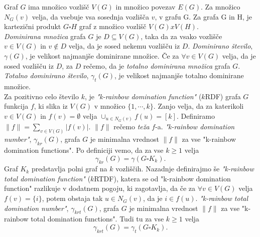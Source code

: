 \documentclass[a4paper]{article}
\begin{document}
Graf $G$ ima množico vozlišč $V(G)$ in množico povezav $E(G)$. Za množico $N_G(v)$ velja, da vsebuje vsa sosednja vozlišča $v$, v grafu G. Za grafa G in H, je kartezični produkt $G \square H$ graf z množico vozlišč $V(G) x V(H)$.\\
\textit{Dominirana množica} grafa $G$ je $D \subseteq V(G)$, taka da za vsako vozlišče $v \in V(G)$ in $v \notin D$ velja, da je sosed nekemu vozlišču iz $D$. \textit{Dominirano število}, $\gamma(G)$, je velikost najmanjše dominirane množice. Če za $\forall v \in V(G)$ velja, da je sosed vozlišču iz $D$, za $D$ rečemo, da je \textit{totalno dominirana množica} grafa $G$. \textit{Totalno dominirano število}, $\gamma_{t}(G)$, je velikost najmanjše totalno dominirane množice.\\
Za pozitivno celo število $k$, je \textit{"k-rainbow domination function"} ($k$RDF) grafa $G$ funkcija $f$, ki slika iz $V(G)$ v množico $\{1, \cdots, k\}$. Zanjo velja, da za katerikoli $v \in V(G)$ in $f(v) = \emptyset$ velja $\cup_{u \in N_G(v)} f(u) = [k]$. Definiramo $\|f\| = \sum_{v \in V(G)}|f(v)|$. $\|f\|$ rečemo \textit{teža} $f$-a. \textit{"k-rainbow domination number"}, $\gamma_{kr}(G)$, grafa $G$ je minimalna vrednost $\|f\|$ za vse "k-rainbow domination functions". Po definiciji vemo, da za vse $k \geq 1$ velja $$\gamma_{kr}(G) = \gamma(G \square K_k).$$
Graf $K_k$ predstavlja polni graf na $k$ vozliščih. Nazadnje definirajmo še \textit{"k-rainbow total domination function"} ($k$RTDF), katera se od "k-rainbow domination function" razlikuje v dodatnem pogoju, ki zagotavlja, da če za $\forall v \in V(G)$ velja $f(v) = \{i\}$, potem obstaja tak $u \in N_G(v)$, da je $i \in f(u)$. \textit{"k-rainbow total domination number"}, $\gamma_{krt}(G)$, grafa $G$ je minimalna vrednost $\|f\|$ za vse "k-rainbow total domination functions". Tudi tu za vse $k \geq 1$ velja $$\gamma_{krt}(G) = \gamma_t(G \square K_k).$$
\end{document}
